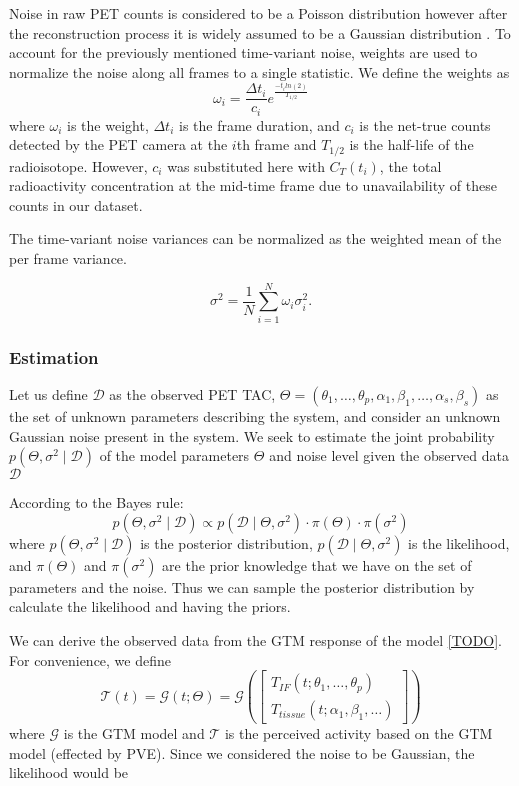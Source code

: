 Noise in raw PET counts is considered to be a Poisson distribution however after the reconstruction process it is widely assumed to be a Gaussian distribution \cite{TODO}. To account for the previously mentioned time-variant noise, weights are used to normalize the noise along all frames to a single statistic. We define the weights as
\[
	\omega_{i} = \frac{\Delta t_i}{c_i} e^{\frac{-t_{i} ln(2)}{T_{1/2}}}
\]
where \(\omega_i\) is the weight, \(\Delta t_i\) is the frame duration, and \(c_i\) is the net-true counts detected by the PET camera at the \(i\)th frame and  \(T_{1/2}\) is the half-life of the radioisotope.
However, \(c_i\) was substituted here with \(C_T(t_i)\), the total radioactivity concentration at the mid-time frame due to unavailability of these counts in our dataset.

The time-variant noise variances can be normalized as the weighted mean of the per frame variance.

\[
	\sigma^2= \frac{1}{N} \sum_{i=1}^{N} \omega_i \sigma_i^2.
\]


\subsubsection{Estimation}
Let us define  \(\mathcal{D}\) as the observed PET TAC, \( \Theta = (\theta_{1}, \dots,\theta_{p}, \alpha_{1}, \beta_{1}, \dots, \alpha_{s}, \beta_{s}) \) as the set of unknown parameters describing the system, and consider an unknown Gaussian noise present in the system. We seek to estimate the joint probability \(p(\Theta,\sigma^2\mid \mathcal{D})\) of the model parameters \(\Theta\) and noise level given the observed data \(\mathcal{D}\)

According to the Bayes rule:
\[
	p(\Theta,\sigma^2 \mid \mathcal{D}) \propto p(\mathcal{D} \mid \Theta,\sigma^2) \cdot \pi( \Theta ) \cdot \pi( \sigma^2)
\]
where  \(p(\Theta,\sigma^2 \mid \mathcal{D})\) is the posterior distribution, \(p(\mathcal{D} \mid \Theta,\sigma^2)\) is the likelihood, and $\pi(\Theta)$ and $\pi(\sigma^2)$ are the prior knowledge that we have on the set of parameters and the noise. Thus we can sample the posterior distribution by calculate the likelihood and having the priors.


We can derive the observed data from the GTM response of the model \ref{TODO}. For convenience, we define
\[
	\mathcal{T}(t) = \mathcal{G}(t;\Theta) =
	\mathcal{G}\left(
	\begin{bmatrix}
			T_{IF}(t;\theta_{1}, \dots, \theta_{p}) \\
			T_{tissue}(t;\alpha_{1}, \beta_{1}, \dots)
		\end{bmatrix}\right)
\]
where $\mathcal{G}$ is the GTM model and $\mathcal{T}$ is the perceived activity based on the GTM model (effected by PVE). Since we considered the noise to be Gaussian, the likelihood would be

